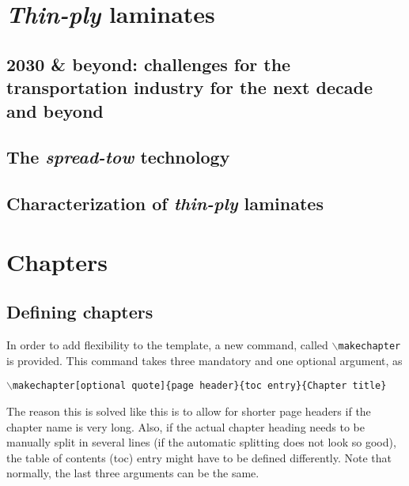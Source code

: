 \section{\emph{Thin-ply} laminates}

\subsection{2030 \& beyond: challenges for the transportation industry for the next decade and beyond}

\subsection{The \emph{spread-tow} technology}



\subsection{Characterization of \emph{thin-ply} laminates}



\section{Chapters}
\subsection{Defining chapters}
In order to add flexibility to the template, a new command, called \texttt{$\backslash$makechapter} is provided. This command takes three mandatory and one optional argument, as 
\begin{center}
	\texttt{$\backslash$makechapter[optional quote]\{page header\}\{toc entry\}\{Chapter title\}}
\end{center}

The reason this is solved like this is to allow for shorter page headers if the chapter name is very long. Also, if the actual chapter heading needs to be manually split in several lines (if the automatic splitting does not look so good), the table of contents (toc) entry might have to be defined differently. Note that normally, the last three arguments can be the same. 

